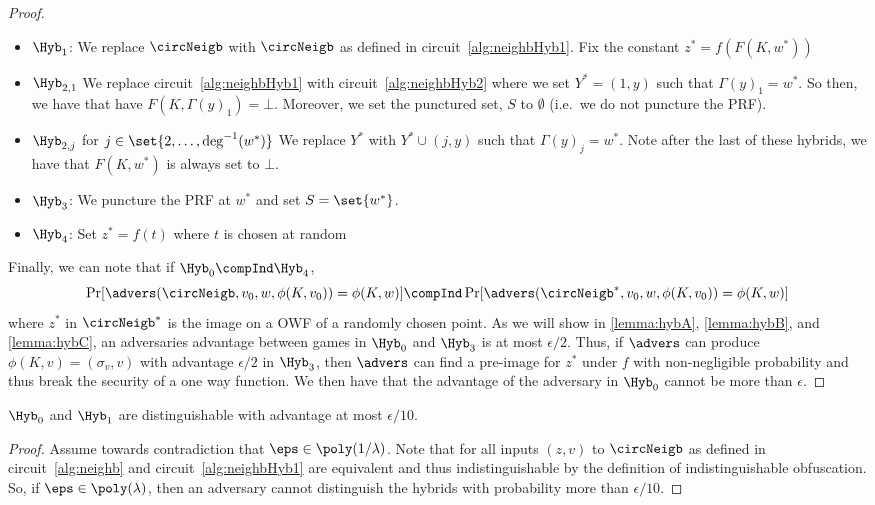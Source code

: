 \begin{lemma}
\begin{proof}
\begin{itemize}
			\item $\Hyb_1$: We replace $\circNeigb$ with $\circNeigb$ as defined in circuit~\ref{alg:neighbHyb1}.
			Fix the constant $z^* = f(F(K, w^*))$
			\item $\Hyb_{2, 1}$
			We replace circuit~\ref{alg:neighbHyb1} with circuit~\ref{alg:neighbHyb2} where we 
			set $Y^* = (1, y)$ such that $\Gamma(y)_1 = w^*$. So then, we have that
			have $F(K, \Gamma(y)_1) = \bot$. Moreover, we set the punctured set, $S$ to $\emptyset$ (i.e.\ we do not puncture the PRF).
			\item $\Hyb_{2, j}$ for $j \in \set{2, \dots, \deg^{-1}(w^*)}$
			We replace $Y^*$ with $Y^* \cup (j, y)$ such that $\Gamma(y)_j = w^*$.
			Note after the last of these hybrids, we have that $F(K, w^*)$ is always set to $\bot$.
			\item $\Hyb_3$: We puncture the PRF at $w^*$ and set $S = \set{w^*}$.
			\item $\Hyb_4$: Set $z^* = f(t)$ where $t$ is chosen at random %
		\end{itemize}
		Finally, we can note that if $\Hyb_0 \compInd \Hyb_4$,
		\begin{equation*}
			\Pr[\advers(\circNeigb, v_0, w, \phi(K, v_0)) = \phi(K, w)] 
			\compInd
			\Pr[\advers(\circNeigb^*, v_0, w, \phi(K, v_0)) = \phi(K, w)]
		\end{equation*}
		where $z^*$ in $\circNeigb^*$	is the image on a OWF of a randomly chosen point.
		As we will show in \cref{lemma:hybA}, \cref{lemma:hybB}, and \cref{lemma:hybC},
		an adversaries advantage between games in $\Hyb_0$ and $\Hyb_3$ is at most $\epsilon / 2$.
		Thus, if $\advers$ can produce $\phi(K, v) = (\sigma_v, v)$ with advantage $\epsilon / 2$
		in $\Hyb_3$, then $\advers$
		can find a pre-image for $z^*$ under $f$ with non-negligible probability and thus break the security of a one way function.
		We then have that the advantage of the adversary in $\Hyb_0$ cannot be more than $\epsilon$.
	\end{proof}
\end{lemma}

\begin{lemma}
	\label{lemma:hybA}
	$\Hyb_0$ and $\Hyb_1$ are distinguishable with advantage at most $\epsilon / 10$.
	\begin{proof}
		Assume towards contradiction that $\eps \in \poly(1/\lambda)$.
		Note that for all inputs $(z, v)$ to $\circNeigb$ as defined in circuit~\ref{alg:neighb} and circuit~\ref{alg:neighbHyb1}
		are equivalent and thus indistinguishable by the definition of indistinguishable obfuscation.
		So, if $\eps \in \poly(\lambda)$, then an adversary cannot distinguish the hybrids with probability more than $\epsilon / 10$.
	\end{proof}
\end{lemma}

